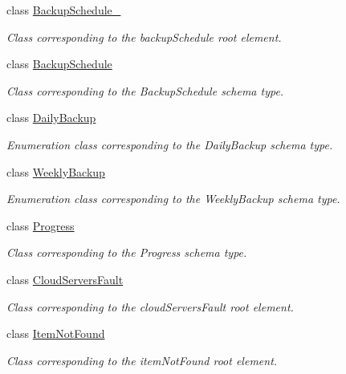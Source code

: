 \begin{DoxyCompactItemize}
class \hyperlink{classopenstack_1_1xml_1_1BackupSchedule__}{BackupSchedule\_\-}
\begin{DoxyCompactList}\small\item\em Class corresponding to the backupSchedule root element. \item\end{DoxyCompactList}\item 
class \hyperlink{classopenstack_1_1xml_1_1BackupSchedule}{BackupSchedule}
\begin{DoxyCompactList}\small\item\em Class corresponding to the BackupSchedule schema type. \item\end{DoxyCompactList}\item 
class \hyperlink{classopenstack_1_1xml_1_1DailyBackup}{DailyBackup}
\begin{DoxyCompactList}\small\item\em Enumeration class corresponding to the DailyBackup schema type. \item\end{DoxyCompactList}\item 
class \hyperlink{classopenstack_1_1xml_1_1WeeklyBackup}{WeeklyBackup}
\begin{DoxyCompactList}\small\item\em Enumeration class corresponding to the WeeklyBackup schema type. \item\end{DoxyCompactList}\item 
class \hyperlink{classopenstack_1_1xml_1_1Progress}{Progress}
\begin{DoxyCompactList}\small\item\em Class corresponding to the Progress schema type. \item\end{DoxyCompactList}\item 
class \hyperlink{classopenstack_1_1xml_1_1CloudServersFault}{CloudServersFault}
\begin{DoxyCompactList}\small\item\em Class corresponding to the cloudServersFault root element. \item\end{DoxyCompactList}\item 
class \hyperlink{classopenstack_1_1xml_1_1ItemNotFound}{ItemNotFound}
\begin{DoxyCompactList}\small\item\em Class corresponding to the itemNotFound root element. \item\end{DoxyCompactList}\item 

\end{DoxyCompactItemize}
